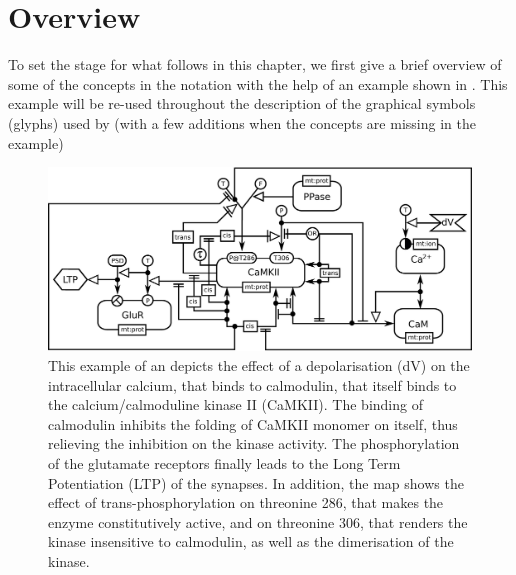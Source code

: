 
\section{Overview}\label{sec:overview}

To set the stage for what follows in this chapter, we first give a brief overview of some of the concepts in the \ER notation with the help of an example shown in . This example will be re-used throughout the description of the graphical symbols (glyphs) used by \SBGNERLone (with a few additions when the concepts are missing in the example) 

\begin{figure}[H]
  \centering
  \vspace*{-0.75em}
  \includegraphics[scale=0.45]{examples/CaMKII-intro}
   \caption{This example of an \ERm depicts the effect of a depolarisation (dV) on the intracellular calcium, that binds to calmodulin, that itself binds to the calcium/calmoduline kinase II (CaMKII). The binding of calmodulin inhibits the folding of CaMKII monomer on itself, thus relieving the inhibition on the kinase activity. The phosphorylation of the glutamate receptors finally leads to the Long Term Potentiation (LTP) of the synapses. In addition, the map shows the effect of trans-phosphorylation on threonine 286, that makes the enzyme constitutively active, and on threonine 306, that renders the kinase insensitive to calmodulin, as well as the dimerisation of the kinase.}
  \label{fig:eg1}
\end{figure}
 
